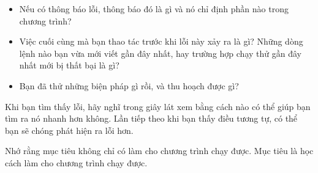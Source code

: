 \documentclass[11pt]{book}
\begin{document}
\begin{itemize}

\item Nếu có thông báo lỗi, thông báo đó là gì và nó
chỉ định phần nào trong chương trình?

\item Việc cuối cùng mà bạn thao tác trước khi lỗi này xảy ra là gì?
Những dòng lệnh nào bạn vừa mới viết gần đây nhất, hay trường hợp
chạy thử gần đây nhất mới bị thất bại là gì?

\item Bạn đã thử những biện pháp gì rồi, và thu hoạch được gì?

\end{itemize}

Khi bạn tìm thấy lỗi, hãy nghĩ trong giây lát xem bằng cách nào
có thể giúp bạn tìm ra nó nhanh hơn không. Lần tiếp theo khi bạn
thấy điều tương tự, có thể bạn sẽ chóng phát hiện ra lỗi hơn.

Nhớ rằng mục tiêu không chỉ có làm cho chương trình chạy được.
Mục tiêu là học cách làm cho chương trình chạy được.


\printindex

\clearemptydoublepage
\end{document}
